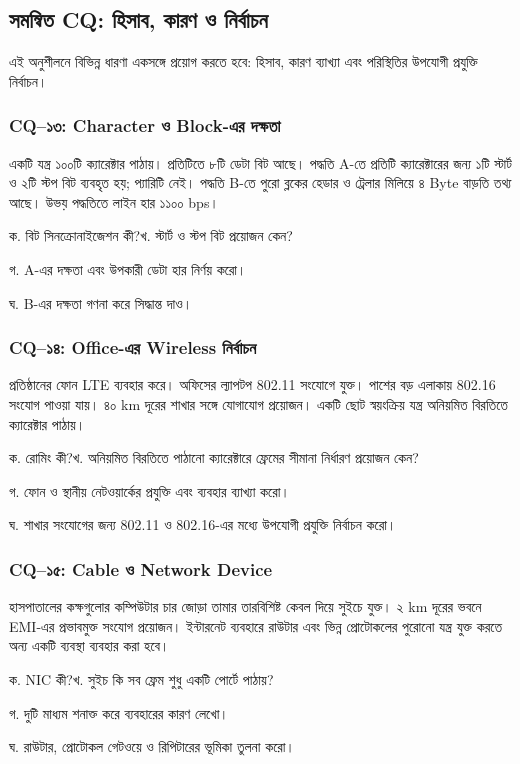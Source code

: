 \subsection{সমন্বিত CQ: হিসাব, কারণ ও নির্বাচন}
এই অনুশীলনে বিভিন্ন ধারণা একসঙ্গে প্রয়োগ করতে হবে: হিসাব, কারণ ব্যাখ্যা এবং পরিস্থিতির উপযোগী প্রযুক্তি নির্বাচন।

\subsubsection{CQ–১৩: Character ও Block-এর দক্ষতা}
একটি যন্ত্র ১০০টি ক্যারেক্টার পাঠায়। প্রতিটিতে ৮টি ডেটা বিট আছে। পদ্ধতি A-তে প্রতিটি ক্যারেক্টারের জন্য ১টি স্টার্ট ও ২টি স্টপ বিট ব্যবহৃত হয়; প্যারিটি নেই। পদ্ধতি B-তে পুরো ব্লকের হেডার ও ট্রেলার মিলিয়ে ৪ Byte বাড়তি তথ্য আছে। উভয় পদ্ধতিতে লাইন হার ১১০০ bps।
\begin{compactenum}
\item ক. বিট সিনক্রোনাইজেশন কী?\quad খ. স্টার্ট ও স্টপ বিট প্রয়োজন কেন?
\item গ. A-এর দক্ষতা এবং উপকারী ডেটা হার নির্ণয় করো।
\item ঘ. B-এর দক্ষতা গণনা করে সিদ্ধান্ত দাও।
\end{compactenum}

\subsubsection{CQ–১৪: Office-এর Wireless নির্বাচন}
প্রতিষ্ঠানের ফোন LTE ব্যবহার করে। অফিসের ল্যাপটপ 802.11 সংযোগে যুক্ত। পাশের বড় এলাকায় 802.16 সংযোগ পাওয়া যায়। ৪০ km দূরের শাখার সঙ্গে যোগাযোগ প্রয়োজন। একটি ছোট স্বয়ংক্রিয় যন্ত্র অনিয়মিত বিরতিতে ক্যারেক্টার পাঠায়।
\begin{compactenum}
\item ক. রোমিং কী?\quad খ. অনিয়মিত বিরতিতে পাঠানো ক্যারেক্টারে ফ্রেমের সীমানা নির্ধারণ প্রয়োজন কেন?
\item গ. ফোন ও স্থানীয় নেটওয়ার্কের প্রযুক্তি এবং ব্যবহার ব্যাখ্যা করো।
\item ঘ. শাখার সংযোগের জন্য 802.11 ও 802.16-এর মধ্যে উপযোগী প্রযুক্তি নির্বাচন করো।
\end{compactenum}

\subsubsection{CQ–১৫: Cable ও Network Device}
হাসপাতালের কক্ষগুলোর কম্পিউটার চার জোড়া তামার তারবিশিষ্ট কেবল দিয়ে সুইচে যুক্ত। ২ km দূরের ভবনে EMI-এর প্রভাবমুক্ত সংযোগ প্রয়োজন। ইন্টারনেট ব্যবহারে রাউটার এবং ভিন্ন প্রোটোকলের পুরোনো যন্ত্র যুক্ত করতে অন্য একটি ব্যবস্থা ব্যবহার করা হবে।
\begin{compactenum}
\item ক. NIC কী?\quad খ. সুইচ কি সব ফ্রেম শুধু একটি পোর্টে পাঠায়?
\item গ. দুটি মাধ্যম শনাক্ত করে ব্যবহারের কারণ লেখো।
\item ঘ. রাউটার, প্রোটোকল গেটওয়ে ও রিপিটারের ভূমিকা তুলনা করো।
\end{compactenum}

